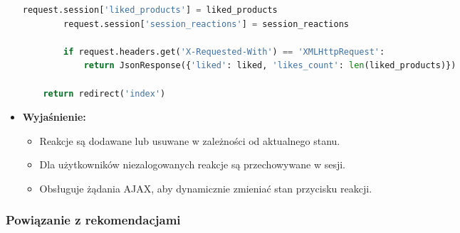 \documentclass[12pt,a4paper,oneside]{article}
\theoremstyle{definition}
\numberwithin{equation}{section}
\begin{document}
\begin{itemize}
\begin{lstlisting}[language=Python, caption=Widok \texttt{product\_like}]
        request.session['liked_products'] = liked_products
        request.session['session_reactions'] = session_reactions

        if request.headers.get('X-Requested-With') == 'XMLHttpRequest':
            return JsonResponse({'liked': liked, 'likes_count': len(liked_products)})

    return redirect('index')
    \end{lstlisting}
    \item \textbf{Wyjaśnienie:}
    \begin{itemize}
        \item Reakcje są dodawane lub usuwane w zależności od aktualnego stanu.
        \item Dla użytkowników niezalogowanych reakcje są przechowywane w sesji.
        \item Obsługuje żądania AJAX, aby dynamicznie zmieniać stan przycisku reakcji.
    \end{itemize}
\end{itemize}

\subsubsection{Powiązanie z rekomendacjami}
\end{document}
